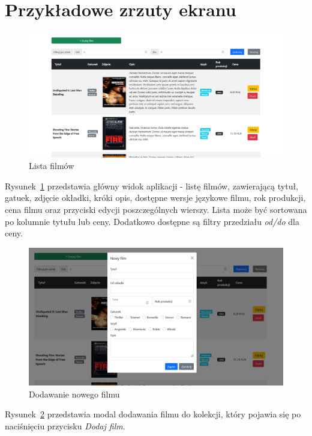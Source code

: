 \documentclass[
    12pt, %
]{fphw}
\begin{document}
    \section{Przykładowe zrzuty ekranu}
    \begin{figure}[H]
        \includegraphics[width=\linewidth]{./assets/1.PNG}
        \caption{Lista filmów}
        \label{fig:movie-list}
    \end{figure}

    Rysunek~\ref{fig:movie-list} przedstawia główny widok aplikacji - listę filmów, zawierającą tytuł,
    gatuek, zdjęcie okładki, króki opis, dostępne wersje językowe filmu, rok produkcji,
    cena filmu oraz przyciski edycji poszczególnych wierszy.
    Lista może być sortowana po kolumnie tytułu lub ceny.
    Dodatkowo dostępne są filtry przedziału \textit{od/do} dla ceny.

    \begin{figure}[H]
        \includegraphics[width=\linewidth]{./assets/2.PNG}
        \caption{Dodawanie nowego filmu}
        \label{fig:add}
    \end{figure}

    Rysunek~\ref{fig:add} przedstawia modal dodawania filmu do kolekcji, który pojawia się po naciśnięciu przycisku
    \textit{Dodaj film}.
\end{document}
